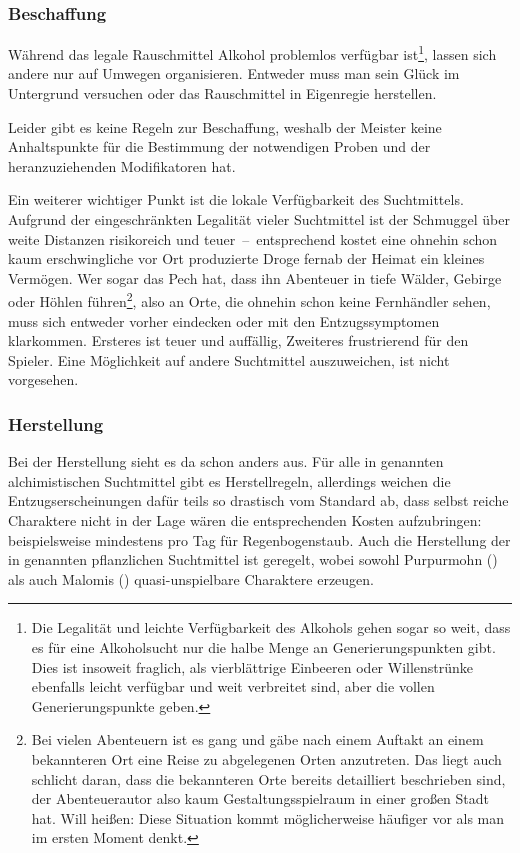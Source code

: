 \subsubsection{Beschaffung}
Während das legale Rauschmittel Alkohol problemlos verfügbar ist\footnote{Die Legalität und leichte Verfügbarkeit des Alkohols gehen sogar so weit, dass es für eine Alkoholsucht nur die halbe Menge an Generierungspunkten gibt. Dies ist insoweit fraglich, als vierblättrige Einbeeren oder Willenstrünke ebenfalls leicht verfügbar und weit verbreitet sind, aber die vollen Generierungspunkte geben.}, lassen sich andere nur auf Umwegen organisieren. Entweder muss man sein Glück im Untergrund versuchen oder das Rauschmittel in Eigenregie herstellen.

Leider gibt es keine Regeln zur Beschaffung, weshalb der Meister keine Anhaltspunkte für die Bestimmung der notwendigen Proben und der heranzuziehenden Modifikatoren hat.

Ein weiterer wichtiger Punkt ist die lokale Verfügbarkeit des Suchtmittels. Aufgrund der eingeschränkten Legalität vieler Suchtmittel ist der Schmuggel über weite Distanzen risikoreich und teuer~--~entsprechend kostet eine ohnehin schon kaum erschwingliche vor Ort produzierte Droge fernab der Heimat ein kleines Vermögen. Wer sogar das Pech hat, dass ihn Abenteuer in tiefe Wälder, Gebirge oder Höhlen führen\footnote{Bei vielen Abenteuern ist es gang und gäbe nach einem Auftakt an einem bekannteren Ort eine Reise zu abgelegenen Orten anzutreten. Das liegt auch schlicht daran, dass die bekannteren Orte bereits detailliert beschrieben sind, der Abenteuerautor also kaum Gestaltungsspielraum in einer großen Stadt hat. Will heißen: Diese Situation kommt möglicherweise häufiger vor als man im ersten Moment denkt.}, also an Orte, die ohnehin schon keine Fernhändler sehen, muss sich entweder vorher eindecken oder mit den Entzugssymptomen klarkommen. Ersteres ist teuer und auffällig, Zweiteres frustrierend für den Spieler. Eine Möglichkeit auf andere Suchtmittel auszuweichen, ist nicht vorgesehen.

\subsubsection{Herstellung}
Bei der Herstellung sieht es da schon anders aus. Für alle in  genannten alchimistischen Suchtmittel gibt es Herstellregeln, allerdings weichen die Entzugserscheinungen dafür teils so drastisch vom Standard ab, dass selbst reiche Charaktere nicht in der Lage wären die entsprechenden Kosten aufzubringen: beispielsweise mindestens  pro Tag für Regenbogenstaub. Auch die Herstellung der in  genannten pflanzlichen Suchtmittel ist geregelt, wobei sowohl Purpurmohn () als auch Malomis () quasi-unspielbare Charaktere erzeugen.

